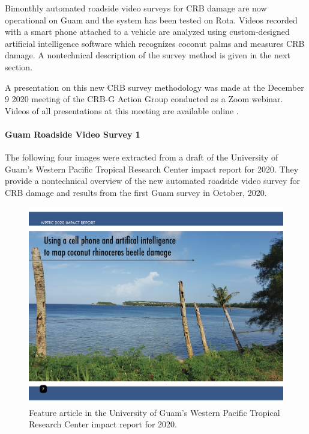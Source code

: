 \documentclass[12pt,letterpaper,english,bibliography=totocnumbered,abstract=on]{scrartcl}
\begin{document}
Bimonthly automated roadside video surveys for CRB damage are now operational on Guam and the system has been tested on Rota. Videos recorded with a smart phone attached to a vehicle are analyzed using custom-designed artificial intelligence software which recognizes coconut palms and measures CRB damage. A nontechnical description of the survey method is given in the next section.

A presentation on this new CRB survey methodology was made at the December 9 2020 meeting of the CRB-G Action Group conducted as a Zoom webinar. Videos of all presentations at this meeting are available online \cite{mooreVideoRecordingCRBG2020}.

\clearpage
\paragraph{Guam Roadside Video Survey 1}

The following four images were extracted from a draft of the University of Guam's Western Pacific Tropical Research Center impact report for 2020. They provide a nontechnical overview of the new automated roadside video survey for CRB damage and results from the first Guam survey in October, 2020.

\begin{figure}[h]
	\centering
	\includegraphics[width=1\linewidth]{images/impact-report07.png}
	\caption{Feature article in the University of Guam's Western Pacific Tropical Research Center impact report for 2020.}
	\label{fig:roadside1-1}
\end{figure}
\end{document}
